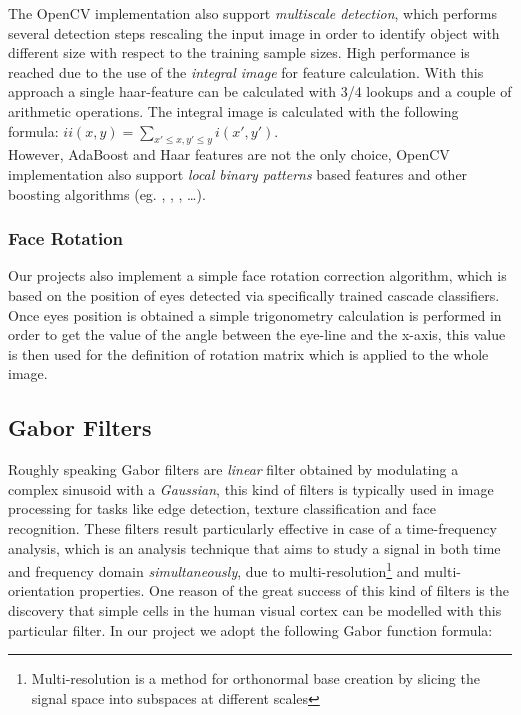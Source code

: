 The OpenCV implementation also support \emph{multiscale detection}, which performs several detection steps rescaling the input image in order to identify object with different size with respect to the training sample sizes. High performance is reached due to the use of the \emph{integral image} for feature calculation. With this approach a single haar-feature can be calculated with 3/4 lookups and a couple of arithmetic operations. The integral image is calculated with the following formula: $ ii(x,y) = \sum_{x' \leq x, y' \leq y}{ i(x',y') } $.\\

However, AdaBoost and Haar features are not the only choice, OpenCV implementation also support \emph{local binary patterns} based features and other boosting algorithms (eg. , , , \ldots).


\subsubsection*{Face Rotation}

Our projects also implement a simple face rotation correction algorithm, which is based on the position of eyes detected via specifically trained cascade classifiers. Once eyes position is obtained a simple trigonometry calculation is performed in order to get the value of the angle between the eye-line and the x-axis, this value is then used for the definition of rotation matrix which is applied to the whole image.

\subsection{Gabor Filters}

Roughly speaking Gabor filters are \emph{linear} filter obtained by modulating a complex sinusoid with a \emph{Gaussian}, this kind of filters is typically used in image processing for tasks like edge detection, texture classification and face recognition\cite{gaborApplication}. These filters result particularly effective in case of a time-frequency analysis, which is an analysis technique that aims to study a signal in both time and frequency domain \emph{simultaneously}, due to multi-resolution\footnote{Multi-resolution is a method for orthonormal base creation by slicing the signal space into subspaces at different scales} and multi-orientation properties. One reason of the great success of this kind of filters is the discovery that simple cells in the human visual cortex can be modelled with this particular filter. In our project we adopt the following Gabor function formula:

